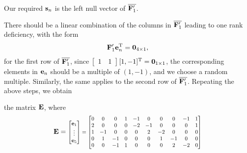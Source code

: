 \documentclass[conference,letterpaper]{IEEEtran}
\begin{document}
\begin{example}

Our required ${\bf s}_n$ is the left null vector of $\overline{{\bf F}^{\prime}_1}$. 

There should be a linear combination of the columns in $\overline{{\bf F}^{\prime}_1}$ leading to one rank deficiency, with the form
\begin{align}
 {\bf F}'_1 {\bf e}_n^{\text{\rm T}} = {\bf 0}_{4 \times 1},
 \label{eq: linear reduction equation}
\end{align}
for the first row of $\overline{{\bf F}^{\prime}_1}$, since $\left[ {\begin{array}{cc} 1 & 1 \\ \end{array}} \right] [1, -1]^{\text{\rm T}} = {\bf 0}_{1 \times 1}$, the corresponding elements in ${\bf e}_n$ should be a multiple of $(1, -1)$, and we choose a random multiple. Similarly, the same applies to the second row of $\overline{{\bf F}^{\prime}_1}$. Repeating the above steps, we obtain

the matrix ${\bf E}$, where
\begin{align}
{\bf E} = 
\scalebox{0.8}{$
\begin{bmatrix}
\ev_1\\
\vdots \\
\ev_5
\end{bmatrix} =  
\begin{bmatrix}
0 & 0 & 0 & 1 & -1 & 0 & 0 & 0 & -1 & 1 \\
2 & 0 & 0 & 0 & -2 & -1 & 0 & 0 & 0 & 1 \\
1 & -1 & 0 & 0 & 0 & 2 & -2 & 0 & 0 & 0 \\
0 & 1 & -1 & 0 & 0 & 0 & 1 & -1 & 0 & 0 \\
0 & 0 & -1 & 1 & 0 & 0 & 0 & 2 & -2 & 0 \\
\end{bmatrix}
$}
\label{eq:E for example}
\end{align}


\end{example}
\end{document}
